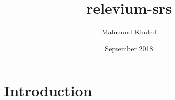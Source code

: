\documentclass{article}
\title{relevium-srs}
\author{Mahmoud Khaled}
\date{September 2018}
\begin{document}
\maketitle

\section{Introduction}
\end{document}
